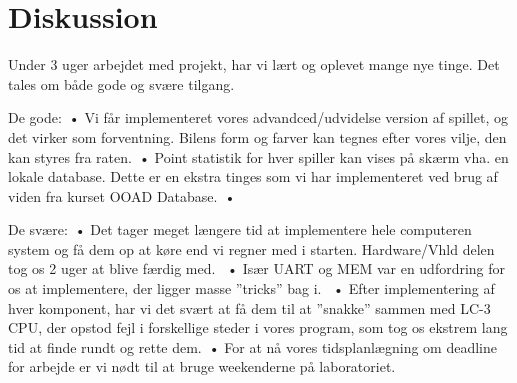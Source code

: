 \chapter{Diskussion}\label{cha:diskussion}
Under 3 uger arbejdet med projekt, har vi lært og oplevet mange nye tinge. Det tales om både gode og svære tilgang. \

De gode:\
•	Vi får implementeret vores advandced/udvidelse version af spillet, og det virker som forventning. Bilens form og farver kan tegnes efter vores vilje, den kan styres fra raten.\
•	Point statistik for hver spiller kan vises på skærm vha. en lokale database. Dette er en ekstra tinges som vi har implementeret ved brug af viden fra kurset OOAD Database.\
•	\

De svære:\
•	Det tager meget længere tid at implementere hele computeren system og få dem op at køre end vi regner med i starten. Hardware/Vhld delen tog os 2 uger at blive færdig med. \
•	Især UART og MEM var en udfordring for os at implementere, der ligger masse ”tricks” bag i. \
•	Efter implementering af hver komponent, har vi det svært at få dem til at ”snakke” sammen med LC-3 CPU, der opstod fejl i forskellige steder i vores program, som tog os ekstrem lang tid at finde rundt og rette dem.\
•	For at nå vores tidsplanlægning om deadline for arbejde er vi nødt til at bruge weekenderne på laboratoriet. \
